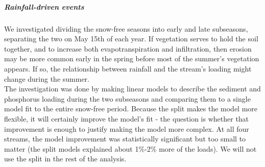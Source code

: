 \documentclass[10pt]{article}
\begin{document}
\subparagraph{Rainfall-driven events}
We investigated dividing the snow-free seasons into early and late subseasons, separating the two on May 15th of each year. If vegetation serves to hold the soil together, and to increase both evapotranspiration and infiltration, then erosion may be more common early in the spring before most of the summer's vegetation appears. If so, the relationship between rainfall and the stream's loading might change during the summer.\\

The investigation was done by making linear models to describe the sediment and phosphorus loading during the two subseasons and comparing them to a single model fit to the entire snow-free period. Because the split makes the model more flexible, it will certainly improve the model's fit - the question is whether that improvement is enough to justify making the model more complex. At all four streams, the model improvement was statistically significant but too small to matter (the split models explained about 1\%-2\% more of the loads). We will not use the split in the rest of the analysis.\\
\end{document}

